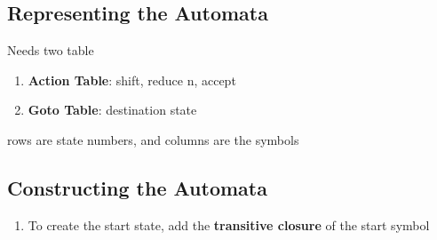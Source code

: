   \subsection{Representing the Automata}

    Needs two table

    \begin{enumerate}
      \item \textbf{Action Table}: shift, reduce n, accept
      \item \textbf{Goto Table}: destination state
    \end{enumerate}

    rows are state numbers, and columns are the symbols

  \subsection{Constructing the Automata}

    \begin{enumerate}
      \item To create the start state, add the \textbf{transitive closure}
      of the start symbol
    \end{enumerate}

